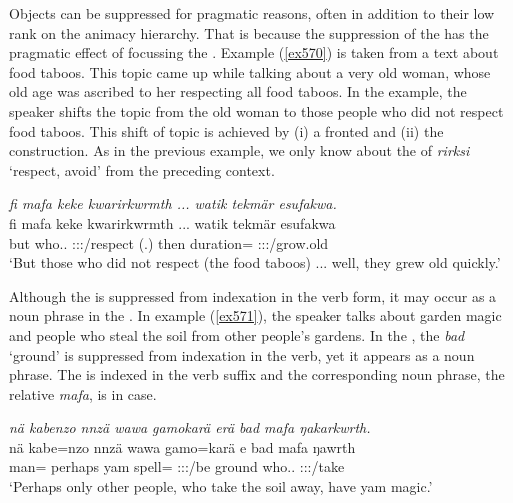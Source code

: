Objects can be suppressed for pragmatic reasons, often in addition to their low rank on the animacy hierarchy. That is because the suppression of the  has the pragmatic effect of focussing the . Example (\ref{ex570}) is taken from a text about food taboos. This topic came up while talking about a very old woman, whose old age was ascribed to her respecting all food taboos. In the example, the speaker shifts the topic from the old woman to those people who did not respect food taboos. This shift of topic is achieved by (i) a fronted  and (ii) the  construction. As in the previous example, we only know about the  of \emph{rirksi} `respect, avoid' from the preceding context.

\begin{exe}
	\ex \emph{fi mafa keke kwarirkwrmth ... watik tekmär esufakwa.}\\
	\gll fi mafa keke kwarirkwrmth ... watik tekmär esufakwa\\
	but who.\Nsg.{\Erg} {\Neg} \Stpl:\Sbj:\Pst:\Dur/respect (.) then duration={\Priv} \Stpl:\Sbj:\Pst:\Ipfv/grow.old\\
	\trans `But those who did not respect (the food taboos) ... well, they grew old quickly.'
	\label{ex570}
\end{exe}

Although the  is suppressed from indexation in the verb form, it may occur as a noun phrase in the . In example (\ref{ex571}), the speaker talks about garden magic and people who steal the soil from other people's gardens. In the , the  \emph{bad} `ground' is suppressed from indexation in the verb, yet it appears as a noun phrase. The  is indexed in the verb suffix and the corresponding noun phrase, the relative  \emph{mafa}, is in  case.

\begin{exe}
	\ex \emph{nä kabenzo nnzä wawa gamokarä erä bad mafa ŋakarkwrth.}\\
	\gll nä kabe=nzo nnzä wawa gamo=karä e bad mafa ŋawrth\\
	{\Indf} man={\Only} perhaps yam spell={\Prop} \Stpl:\Sbj:\Nonpast:\Ipfv/be ground who.\Erg.{\Nsg} \Stpl:\Sbj:\Nonpast:\Ipfv/take\\
	\trans `Perhaps only other people, who take the soil away, have yam magic.'\\
	\label{ex571}
\end{exe}

